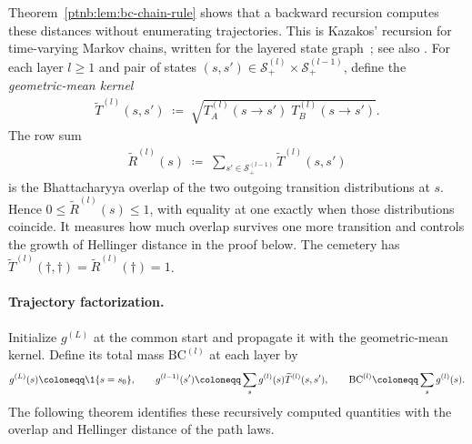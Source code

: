 Theorem~\ref{ptnb:lem:bc-chain-rule} shows that a backward recursion computes these distances without enumerating trajectories. This is Kazakos' recursion for time-varying Markov chains, written for the layered state graph~\parencite[Section~IV, Eqs.~(17)--(29)]{Kazakos1978}; see also \textcite[Lemma~5]{Daskalakis2018MarkovTesting}.
For each layer $l \geq 1$ and pair of states $(s, s') \in \mathcal{S}^{(l)}_+ \times
    \mathcal{S}^{(l-1)}_+$, define the \emph{geometric-mean kernel}
\begin{align}\label{ptnb:eq:geom-kernel}
    \widetilde{T}^{(l)}(s, s') \;\coloneqq\; \sqrt{T^{(l)}_A(s \to s')\; T^{(l)}_B(s \to s')}.
\end{align}
The row sum
\begin{align}\label{ptnb:eq:geom-rowsum}
    \widetilde{R}^{(l)}(s) \;\coloneqq\; \sum_{s' \in \mathcal{S}^{(l-1)}_+} \widetilde{T}^{(l)}(s, s')
\end{align}
is the Bhattacharyya overlap of the two outgoing transition distributions at $s$. Hence $0\le\widetilde R^{(l)}(s)\le1$, with equality at one exactly when those distributions coincide. It measures how much overlap survives one more transition and controls the growth of Hellinger distance in the proof below. The cemetery has $\widetilde T^{(l)}(\dagger,\dagger)=\widetilde R^{(l)}(\dagger)=1$.

\paragraph{Trajectory factorization.}\label{ptnb:sec:lmp-chain-rule}
Initialize $g^{(L)}$ at the common start and propagate it with the geometric-mean kernel. Define its total mass $\mathrm{BC}^{(l)}$ at each layer by
\begin{equation}\label{ptnb:eq:overlap-recursion}
 g^{(L)}(s)\coloneqq\1\{s=s_0\},\qquad
 g^{(l-1)}(s')\coloneqq\sum_s g^{(l)}(s)\widetilde T^{(l)}(s,s'),\qquad
 \mathrm{BC}^{(l)}\coloneqq\sum_s g^{(l)}(s).
\end{equation}
The following theorem identifies these recursively computed quantities with the overlap and Hellinger distance of the path laws.

